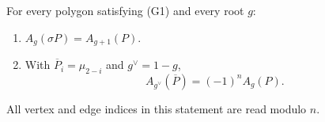 \begin{proposition}\label{prop:A-reversal}
For every polygon satisfying (G1) and every root $g$:
\begin{enumerate}
\item[(i)] $A_g(\sigma P)=A_{g+1}(P)$.
\item[(ii)] With $\overline P_i=\mu_{2-i}$ and $g^\vee=1-g$,
\begin{equation}\label{arpr:reversal}
A_{g^\vee}(\overline P)=(-1)^nA_g(P).
\end{equation}
\end{enumerate}
All vertex and edge indices in this statement are read modulo $n$.
\end{proposition}
